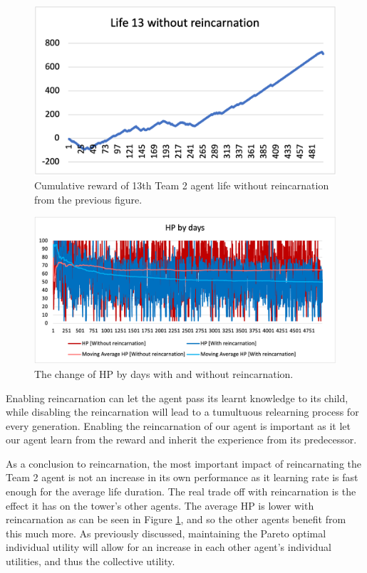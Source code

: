 \begin{figure}
\centering
\includegraphics{004_team_2_agent_design/cum13team2}
\caption{Cumulative reward of 13th Team 2 agent life without reincarnation from the previous figure.}
\end{figure}

\begin{figure}
\centering
\includegraphics{004_team_2_agent_design/hpdaysteam2}
\caption{The change of HP by days with and without reincarnation.}
\label{hpdaysteam2}
\end{figure}

Enabling reincarnation can let the agent pass its learnt knowledge to its child, while disabling the reincarnation will lead to a tumultuous relearning process for every generation. Enabling the reincarnation of our agent is important as it let our agent learn from the reward and inherit the experience from its predecessor. 

As a conclusion to reincarnation, the most important impact of reincarnating the Team 2 agent is not an increase in its own performance as it learning rate is fast enough for the average life duration. The real trade off with reincarnation is the effect it has on the tower’s other agents. The average HP is lower with reincarnation as can be seen in Figure \ref{hpdaysteam2}, and so the other agents benefit from this much more. As previously discussed, maintaining the Pareto optimal individual utility will allow for an increase in each other agent’s individual utilities, and thus the collective utility.


